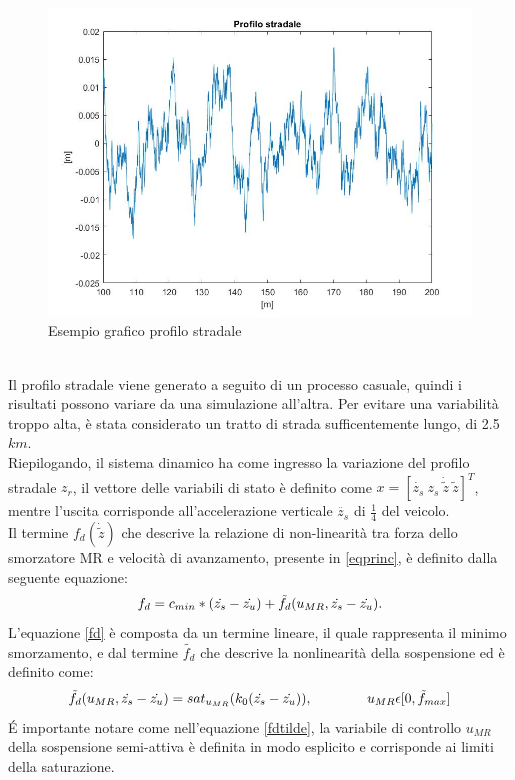 \begin{figure}[hbt]
	\centering
	\includegraphics[scale=0.3]{figure/profilostradale.jpg}
	\caption{Esempio grafico profilo stradale}
	\label{fig:profilostradale}
\end{figure}\\
Il profilo stradale viene generato a seguito di un processo casuale, quindi i risultati possono variare da una simulazione all'altra. Per evitare una variabilità troppo alta, è stata considerato un tratto di strada sufficentemente lungo, di 2.5$km$.\\

Riepilogando, il sistema dinamico ha come ingresso la variazione del profilo stradale $z_r$, il vettore delle variabili di stato è definito come $x = [\dot{z_s}\ z_s\ \dot{\tilde{z}}\ \tilde{z}]^T $, mentre l'uscita corrisponde all'accelerazione verticale $\ddot{z_s}$ di $\frac{1}{4}$ del veicolo.\\
Il termine $f_d(\dot{\tilde{z}})$ che descrive la relazione di non-linearità tra forza dello smorzatore MR e velocità di avanzamento, presente in \eqref{eqprinc}, è definito dalla seguente equazione:
\begin{equation}
	\centering
	f_d = c_{min}*(\dot{z_s}-\dot{z_u}) + \tilde{f_d}(u_{MR},\dot{z_s}-\dot{z_u})
	.
	\label{fd}
\end{equation}
L'equazione \eqref{fd} è composta da un termine lineare, il quale rappresenta il minimo smorzamento, e dal termine $\tilde{f_d}$ che descrive la nonlinearità della sospensione ed è definito come:
\begin{equation}
	\centering
	\tilde{f_d}(u_{MR},\dot{z_s}-\dot{z_u}) = sat_{u_{MR}}(k_0(\dot{z_s} - \dot{z_u}))
	,
	\qquad\qquad u_{MR} \epsilon [0,\tilde{f}_{max}]
	\label{fdtilde}
\end{equation}
\'E importante notare come nell'equazione \eqref{fdtilde}, la variabile di controllo $u_{MR}$ della sospensione semi-attiva è definita in modo esplicito e corrisponde ai limiti della saturazione.\\	

